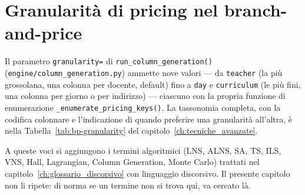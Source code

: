 \section{Granularit\`a di pricing nel branch-and-price}


Il parametro \texttt{granularity=} di
\texttt{run\_column\_generation()}
(\texttt{engine/column\_generation.py}) ammette nove valori
--- da \texttt{teacher} (la pi\`u grossolana, una colonna per
docente, default) fino a \texttt{day} e \texttt{curriculum}
(le pi\`u fini, una colonna per giorno o per indirizzo) ---
ciascuno con la propria funzione di enumerazione
\texttt{\_enumerate\_pricing\_keys()}. La tassonomia completa,
con la codifica colonnare e l'indicazione di quando preferire
una granularit\`a all'altra, \`e nella
Tabella~\ref{tab:bp-granularity} del
capitolo~\ref{ch:tecniche_avanzate}.

\fleuron

A queste voci si aggiungono i termini algoritmici
(LNS, ALNS, SA, TS, ILS, VNS, Hall, Lagrangian, Column
Generation, Monte Carlo) trattati nel
capitolo~\ref{ch:glossario_discorsivo} con linguaggio
discorsivo. Il presente capitolo non li ripete: di norma se
un termine non si trova qui, va cercato l\`a.
